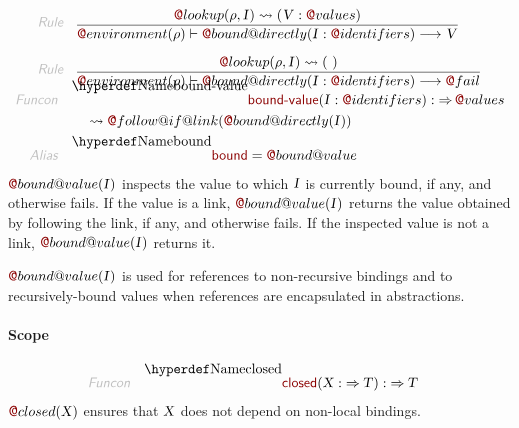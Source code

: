 \begin{align*}
  \KEY{Rule} \quad
    & \RULE{
      \FUN@lookup
        (  \VAR{\ensuremath{\rho}}, 
               \VAR{I} ) \leadsto 
        (  \VAR{V} : \FUN@values )
      }{
      \FUN@environment (  \VAR{\ensuremath{\rho}} ) \vdash \FUN@bound@directly
                    (  \VAR{I} : \FUN@identifiers ) \TRANS 
        \VAR{V}
      }
\\
  \KEY{Rule} \quad
    & \RULE{
      \FUN@lookup
        (  \VAR{\ensuremath{\rho}}, 
               \VAR{I} ) \leadsto 
        (   \  )
      }{
      \FUN@environment (  \VAR{\ensuremath{\rho}} ) \vdash \FUN@bound@directly
                    (  \VAR{I} : \FUN@identifiers ) \TRANS 
        \FUN@fail
      }
\end{align*}
\begin{align*}
  \KEY{Funcon} \quad
  & \FUNDEC{bound-value}(
                     \VAR{I} : \FUN@identifiers) 
    :  \TO \FUN@values \\&\quad
    \leadsto \FUN@follow@if@link
               (  \FUN@bound@directly
                       (  \VAR{I} ) )
\\
  \KEY{Alias} \quad
  & \FUNDEC{bound} = \FUN@bound@value
\end{align*}
$\FUN@bound@value
    (  \VAR{I} )$ inspects the value to which $\VAR{I}$ is currently bound, if any,
   and otherwise fails. If the value is a link, $\FUN@bound@value
    (  \VAR{I} )$ returns the
   value obtained by following the link, if any, and otherwise fails. If the 
   inspected value is not a link, $\FUN@bound@value
    (  \VAR{I} )$ returns it.

$\FUN@bound@value
    (  \VAR{I} )$ is used for references to non-recursive bindings and to
   recursively-bound values when references are encapsulated in abstractions.

\paragraph{Scope}\hypertarget{scope}{}\label{scope}

\begin{align*}
  \KEY{Funcon} \quad
  & \FUNDEC{closed}(
                     \VAR{X} :  \TO \VAR{T}) 
    :  \TO \VAR{T} 
\end{align*}
$\FUN@closed
    (  \VAR{X} )$ ensures that $\VAR{X}$ does not depend on non-local bindings.

